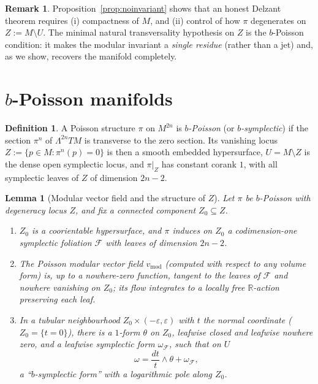 \documentclass{amsart}
\newtheorem{lemma}{Lemma}
\theoremstyle{definition}
\newtheorem{definition}{Definition}
\newtheorem{remark}{Remark}
\begin{document}
\begin{remark}
Proposition~\ref{prop:noinvariant} shows that an honest Delzant theorem requires
(i) compactness of $M$, and (ii) control of how $\pi$ degenerates on
$Z:=M\setminus U$. The minimal natural transversality hypothesis on $Z$ is the
$b$-Poisson condition: it makes the modular invariant a \emph{single residue}
(rather than a jet) and, as we show, recovers the manifold completely.
\end{remark}

\section{$b$-Poisson manifolds}

\begin{definition}\label{def:bpoisson}
A Poisson structure $\pi$ on $M^{2n}$ is \emph{$b$-Poisson} (or
\emph{$b$-symplectic}) if the section $\pi^n$ of $\Lambda^{2n}TM$ is transverse
to the zero section. Its vanishing locus $Z:=\{p\in M:\pi^n(p)=0\}$ is then a
smooth embedded hypersurface, $U=M\setminus Z$ is the dense open symplectic
locus, and $\pi|_Z$ has constant corank $1$, with all symplectic leaves of
$Z$ of dimension $2n-2$.
\end{definition}

\begin{lemma}[Modular vector field and the structure of $Z$]\label{lem:Z}
Let $\pi$ be $b$-Poisson with degeneracy locus $Z$, and fix a connected
component $Z_0\subseteq Z$.
\begin{enumerate}
\item $Z_0$ is a coorientable hypersurface, and $\pi$ induces on $Z_0$ a
codimension-one symplectic foliation $\mathcal F$ with leaves of dimension
$2n-2$.
\item The Poisson \emph{modular vector field} $v_{\mathrm{mod}}$ (computed with
respect to any volume form) is, up to a nowhere-zero function, tangent to the
leaves of $\mathcal F$ and nowhere vanishing on $Z_0$; its flow integrates to a
locally free $\mathbb R$-action preserving each leaf.
\item In a tubular neighbourhood $Z_0\times(-\varepsilon,\varepsilon)$ with $t$
the normal coordinate ($Z_0=\{t=0\}$), there is a $1$-form $\theta$ on $Z_0$,
leafwise closed and leafwise nowhere zero, and a leafwise symplectic form
$\omega_{\mathcal F}$, such that on $U$
\begin{equation}\label{eq:bnf}
\omega=\frac{dt}{t}\wedge\theta+\omega_{\mathcal F},
\end{equation}
a ``$b$-symplectic form'' with a logarithmic pole along $Z_0$.
\end{enumerate}
\end{lemma}
\end{document}
